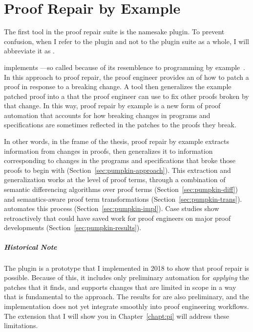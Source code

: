\chapter{Proof Repair by Example}
\label{ch:example}

The first tool in the \sysnamelong proof repair  suite is the namesake \sysnamelong plugin.
To prevent confusion, when I refer to the \sysnamelong plugin and not to the plugin suite as a whole, I will abbreviate it as \intro{\sysname}.

\sysname implements ---so called because of its resemblence to programming by example~\cite{DBLP:journals/ftpl/GulwaniPS17}.
In this approach to proof repair, the proof engineer provides an  of how to patch a proof in response to a breaking change.
A tool then generalizes the example patched proof into a  that the proof engineer can use to fix other proofs broken by that change.
In this way, proof repair by example is a new form of proof automation that accounts for how 
breaking changes in programs and specifications are sometimes reflected in the patches to the proofs they break.

In other words, in the frame of the thesis, proof repair by example extracts information from changes in proofs,
then generalizes it to information corresponding to changes in the programs and specifications that broke those proofs to begin with (Section~\ref{sec:pumpkin-approach}).
This extraction and generalization works at the level of proof terms, through a combination of semantic differencing algorithms 
over proof terms (Section~\ref{sec:pumpkin-diff}) and 
semantics-aware proof term transformations (Section~\ref{sec:pumpkin-trans}).
\sysname automates this process (Section~\ref{sec:pumpkin-impl}).
Case studies show retroactively that \sysname could have saved work for proof engineers
on major proof developments (Section~\ref{sec:pumpkin-results}).

\paragraph{Historical Note}
The \sysname plugin is a prototype that I implemented in 2018 to show that proof repair is possible.
Because of this, it includes only preliminary automation for \textit{applying} the patches that it finds,
and supports changes that are limited in scope in a way that is fundamental to the approach.
The results for \sysname are also preliminary, and the implementation does not yet integrate smoothly into proof engineering workflows.
The \toolnamec extension that I will show you in Chapter~\ref{chapt:pi} will address these limitations.
















